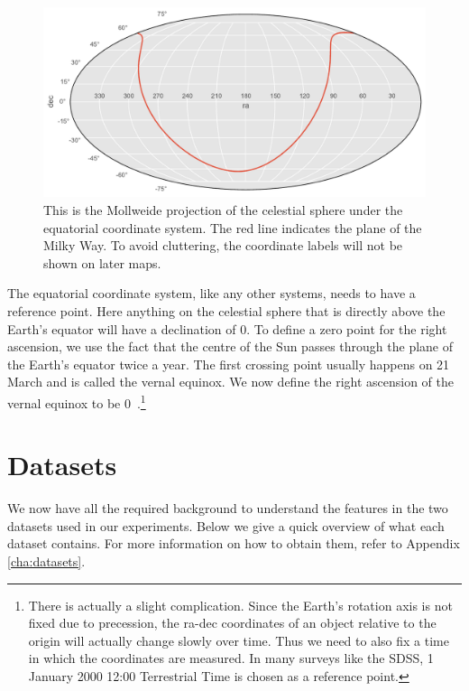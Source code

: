 \begin{figure}[tbp]
	\centering
	\includegraphics[width=\textwidth]{figures/2_astro/mollweide_map}
	\caption[Mollweide projection of the celestial sphere]{This is the Mollweide projection
		of the celestial sphere under the equatorial coordinate system.
		The red line indicates the plane of the Milky Way. To avoid cluttering, the coordinate labels will not be shown on later maps.}
	\label{fig:mollweide} 
\end{figure}

The equatorial coordinate system, like any other systems, needs to have a reference point. Here
anything on the celestial sphere that is directly above the Earth's equator will have a declination
of 0\deg. To define a zero point for the right ascension, we use the fact that the centre of the
Sun passes through the plane of the Earth's equator twice a year. The first crossing point usually
happens on 21 March and is called the vernal equinox. We now define the right
ascension of the vernal equinox to be 0\deg~\cite[Chapter~1]{sparke07}.\footnote{ There is actually
    a slight complication. Since the Earth's rotation axis is not fixed due to
    precession, the ra-dec coordinates of an object relative to the origin will
    actually change slowly over time. Thus we need to also fix a time in which the coordinates are
    measured. In many surveys like the SDSS, 1 January 2000 12:00 Terrestrial Time is chosen as a
    reference point.}




\section{Datasets}
\label{sec:datasets}

We now have all the required background to understand the features in the two datasets used in our
experiments. Below we give a quick overview of what each dataset contains. For more information on
how to obtain them, refer to Appendix \ref{cha:datasets}.

